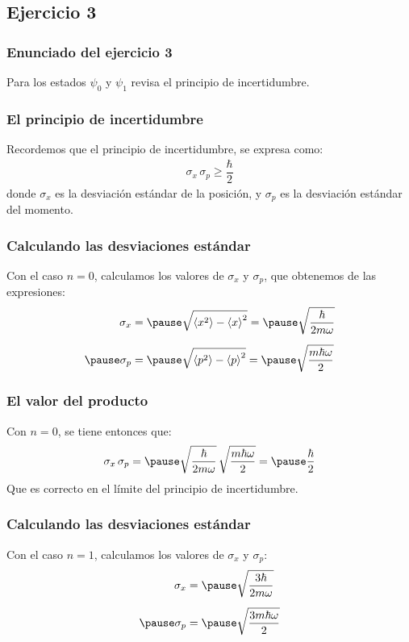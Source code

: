 \documentclass[12pt]{beamer}
\begin{document}
\subsection{Ejercicio 3}

\begin{frame}
\frametitle{Enunciado del ejercicio 3}
Para los estados $\psi_{0}$ y $\psi_{1}$ revisa el principio de incertidumbre.
\end{frame}
\begin{frame}
\frametitle{El principio de incertidumbre}
Recordemos que el principio de incertidumbre, se expresa como:
\pause
\begin{align*}
\sigma_{x} \, \sigma_{p} \geq \dfrac{\hbar}{2}
\end{align*}
\pause
donde $\sigma_{x}$ es la desviación estándar de la posición, y $\sigma_{p}$ es la desviación estándar del momento.
\end{frame}
\begin{frame}
\frametitle{Calculando las desviaciones estándar}
Con el caso $n = 0$, calculamos los valores de $\sigma_{x}$ y $\sigma_{p}$, que obtenemos de las expresiones:
\begin{eqnarray*}
\begin{aligned}
\sigma_{x} &= \pause \sqrt{\expval{x^{2}} - \expval{x}^{2}} = \pause \sqrt{\dfrac{\hbar}{2 m \omega}} \\[0.5em] \pause
\sigma_{p} &= \pause \sqrt{\expval{p^{2}} - \expval{p}^{2}} = \pause \sqrt{\dfrac{m \hbar \omega}{2}}
\end{aligned}
\end{eqnarray*}
\end{frame}
\begin{frame}
\frametitle{El valor del producto}
Con $n = 0$, se tiene entonces que:
\pause
\begin{eqnarray*}
\sigma_{x} \, \sigma_{p} = \pause \sqrt{\dfrac{\hbar}{2 m \omega}} \, \sqrt{\dfrac{m \hbar \omega}{2}} = \pause \dfrac{\hbar}{2}
\end{eqnarray*}
\pause
Que es correcto en el límite del principio de incertidumbre.
\end{frame}
\begin{frame}
\frametitle{Calculando las desviaciones estándar}
Con el caso $n = 1$, calculamos los valores de $\sigma_{x}$ y $\sigma_{p}$:
\pause
\begin{eqnarray*}
\begin{aligned}
\sigma_{x} &= \pause \sqrt{\dfrac{3 \hbar}{2 m \omega}} \\[0.5em] \pause
\sigma_{p} &= \pause \sqrt{\dfrac{3 m \hbar \omega}{2}}
\end{aligned}
\end{eqnarray*}
\end{frame}
\end{document}

